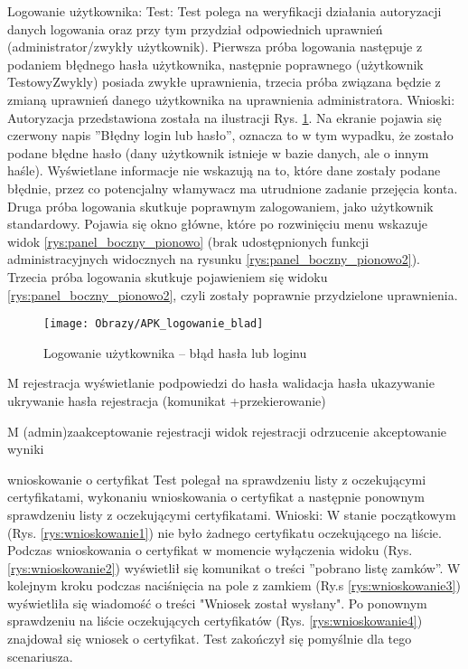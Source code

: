 \begin{enumerate*}
	\item Logowanie użytkownika: \newline
	Test: Test polega na weryfikacji działania autoryzacji danych logowania oraz przy tym przydział odpowiednich uprawnień (administrator/zwykły użytkownik). Pierwsza próba logowania następuje z podaniem błędnego hasła użytkownika, następnie poprawnego (użytkownik TestowyZwykly) posiada zwykłe uprawnienia, trzecia próba związana będzie z zmianą uprawnień danego użytkownika na uprawnienia administratora.\newline
	Wnioski: Autoryzacja przedstawiona została na ilustracji Rys. \ref{rys:Logodwanie_blad_hasla}. Na ekranie pojawia się czerwony napis ''Błędny login lub hasło'', oznacza to w tym wypadku, że zostało podane błędne hasło (dany użytkownik istnieje w bazie danych, ale o innym haśle). Wyświetlane informacje nie wskazują na to, które dane zostały podane błędnie, przez co potencjalny włamywacz ma utrudnione zadanie przejęcia konta. Druga próba logowania skutkuje poprawnym zalogowaniem, jako użytkownik standardowy. Pojawia się okno główne, które po rozwinięciu menu wskazuje widok \ref{rys:panel_boczny_pionowo} (brak udostępnionych funkcji administracyjnych widocznych na rysunku \ref{rys:panel_boczny_pionowo2}). Trzecia próba logowania skutkuje pojawieniem się widoku \ref{rys:panel_boczny_pionowo2}, czyli zostały poprawnie przydzielone uprawnienia.
	
	\begin{figure}[ht!]
		\centering
		\texttt{[image: Obrazy/APK\_logowanie\_blad]}
		\caption{Logowanie użytkownika -- błąd hasła lub loginu}
		\label{rys:Logodwanie_blad_hasla}
	\end{figure}
	\item M rejestracja
	wyświetlanie podpowiedzi do hasła
	walidacja hasła 
	ukazywanie ukrywanie hasła
	rejestracja (komunikat +przekierowanie)
	\item M (admin)zaakceptowanie rejestracji
	widok rejestracji odrzucenie 
	akceptowanie wyniki
	\item  wnioskowanie o certyfikat\newline
	Test polegał na sprawdzeniu listy z oczekującymi certyfikatami, wykonaniu wnioskowania o certyfikat a następnie ponownym sprawdzeniu listy z oczekującymi certyfikatami.
	Wnioski: W stanie początkowym (Rys. \ref{rys:wnioskowanie1}) nie było żadnego certyfikatu oczekującego na liście. Podczas wnioskowania o certyfikat w momencie wyłączenia widoku (Rys. \ref{rys:wnioskowanie2}) wyświetlił się  komunikat o treści ''pobrano listę zamków''. W kolejnym kroku podczas naciśnięcia na pole z zamkiem (Ry.s \ref{rys:wnioskowanie3}) wyświetliła się wiadomość o treści "Wniosek został wysłany". Po ponownym sprawdzeniu na liście oczekujących certyfikatów (Rys. \ref{rys:wnioskowanie4}) znajdował się wniosek o certyfikat. Test zakończył się pomyślnie dla tego scenariusza.
	

\end{enumerate*}
